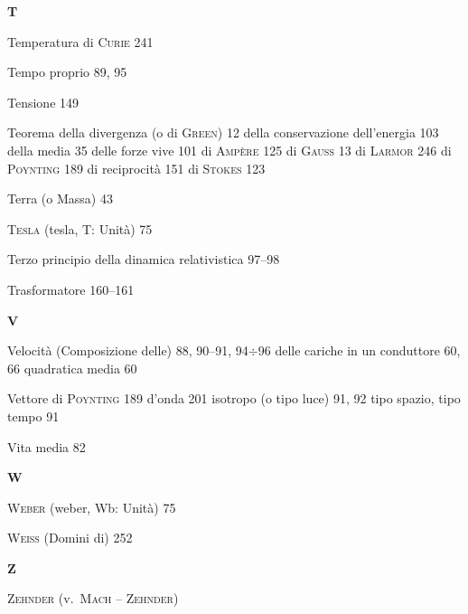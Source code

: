 \begin{theindex}
  \indexspace
  \item \textbf{T}
  \indexspace
  \item Temperatura di \textsc{Curie} 241
  \item Tempo proprio 89, 95
  \item Tensione 149
  \item Teorema
    \subitem della divergenza (o di \textsc{Green}) 12
    \subitem della conservazione dell'energia 103
    \subitem della media 35
    \subitem delle forze vive 101
    \subitem di \textsc{Amp\`ere} 125
    \subitem di \textsc{Gauss} 13
    \subitem di \textsc{Larmor} 246
    \subitem di \textsc{Poynting} 189
    \subitem di reciprocit\`a 151
    \subitem di \textsc{Stokes} 123
  \item Terra (o Massa) 43
  \item \textsc{Tesla} (tesla, T: Unit\`a) 75
  \item Terzo principio della dinamica relativistica 97--98
  \item Trasformatore 160--161

  \indexspace
  \item \textbf{V}
  \indexspace
  \item Velocit\`a
    \subitem (Composizione delle) 88, 90--91, 94$\div$96
    \subitem delle cariche in un conduttore 60, 66
    \subitem quadratica media 60
  \item Vettore
    \subitem di \textsc{Poynting} 189
    \subitem d'onda 201
    \subitem isotropo (o tipo luce) 91, 92
    \subitem tipo spazio, tipo tempo 91
  \item Vita media 82

  \indexspace
  \item \textbf{W}
  \indexspace
  \item \textsc{Weber} (weber, Wb: Unit\`a) 75
  \item \textsc{Weiss} (Domini di) 252

  \indexspace
  \item \textbf{Z}
  \indexspace
  \item \textsc{Zehnder} (v.\ \textsc{Mach} -- \textsc{Zehnder})

\end{theindex}
